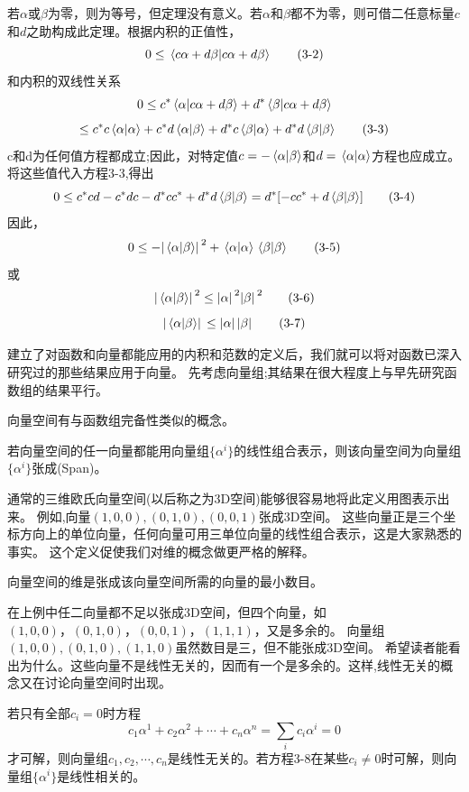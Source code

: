 若$\alpha$或$\beta$为零，则为等号，但定理没有意义。若$\alpha$和$\beta$都不为零，则可借二任意标量$c$和$d$之助构成此定理。根据内积的正值性，
\[0 \leq \bra*{c\alpha+d\beta}\ket*{c\alpha+d\beta} \tag{3-2}\]
和内积的双线性关系
\[0 \leq c^*\bra*{\alpha}\ket*{c\alpha+d\beta}+d^*\bra*{\beta}\ket*{c\alpha+d\beta}\]
\[\leq c^*c\bra*{\alpha}\ket*{\alpha}+c^*d\bra*{\alpha}\ket*{\beta}+d^*c\bra*{\beta}\ket*{\alpha}+d^*d\bra*{\beta}\ket*{\beta} \tag{3-3}\]
c和d为任何值方程都成立;因此，对特定值$c=-\bra*{\alpha}\ket*{\beta}$和$d=\bra*{\alpha}\ket*{\alpha}$方程也应成立。将这些值代入方程3-3,得出
\[0 \leq c^*cd-c^*dc-d^*cc^*+d^*d\bra*{\beta}\ket*{\beta}=d^*[-cc^*+d\bra*{\beta}\ket*{\beta}] \tag{3-4}\]
因此，
\[0 \leq -\abs*{\bra*{\alpha}\ket*{\beta}}^2+\bra*{\alpha}\ket*{\alpha}\bra*{\beta}\ket*{\beta} \tag{3-5}\]
或
\[\abs*{\bra*{\alpha}\ket*{\beta}}^2 \leq \abs*{\alpha}^2\abs*{\beta}^2 \tag{3-6}\]
\[\abs*{\bra*{\alpha}\ket*{\beta}} \leq \abs*{\alpha}\abs*{\beta} \tag{3-7}\]

建立了对函数和向量都能应用的内积和范数的定义后，我们就可以将对函数已深入研究过的那些结果应用于向量。
先考虑向量组;其结果在很大程度上与早先研究函数组的结果平行。

向量空间有与函数组完备性类似的概念。
\begin{definition}[向量空间]
    若向量空间的任一向量都能用向量组$\{\alpha^i\}$的线性组合表示，则该向量空间为向量组$\{\alpha^i\}$张成(Span)。
\end{definition}

通常的三维欧氏向量空间(以后称之为3D空间)能够很容易地将此定义用图表示出来。
例如,向量$(1,0,0),(0,1,0),(0,0,1)$张成3D空间。
这些向量正是三个坐标方向上的单位向量，任何向量可用三单位向量的线性组合表示，这是大家熟悉的事实。
这个定义促使我们对维的概念做更严格的解释。

\begin{definition}[向量空间的维数]
    向量空间的维是张成该向量空间所需的向量的最小数目。
\end{definition}

在上例中任二向量都不足以张成3D空间，但四个向量，如$(1,0,0)，(0,1,0)，(0,0,1)，(1,1,1)$，又是多余的。
向量组$(1,0,0),(0,1,0),(1,1,0)$虽然数目是三，但不能张成3D空间。
希望读者能看出为什么。这些向量不是线性无关的，因而有一个是多余的。这样,线性无关的概念又在讨论向量空间时出现。

\begin{definition}
    若只有全部$c_i=0$时方程
    \[c_1\alpha^1+c_2\alpha^2+\cdots+c_n\alpha^n=\sum_ic_i\alpha^i=0 \tag{3-8}\]
    才可解，则向量组$c_1 ,c_2,\cdots,c_n$是线性无关的。若方程3-8在某些$c_i \neq 0$时可解，则向量组$\{\alpha^i\}$是线性相关的。
\end{definition}

